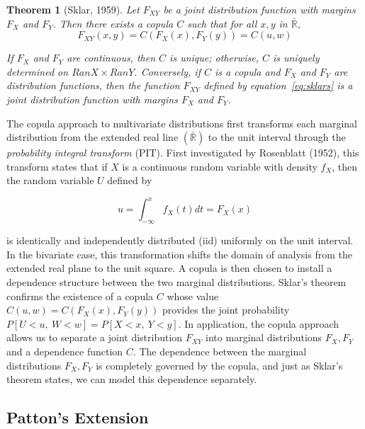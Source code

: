 \documentclass[12pt]{article}
\newtheorem{thm}{Theorem}
\begin{document}
\begin{thm} [Sklar, 1959] \label{thm:skl}
Let $F_{XY}$ be a joint distribution function with margins $F_{X}$ and $F_{Y}$. Then there exists a copula $C$ such that for all $x,y$ in $\bar{\mathbb{R}}$,
\begin{equation} \label{eq:sklars}
F_{XY}\left( x,y\right) =C\left(F_{X}\left(x\right), F_{Y}\left(y\right)\right) = C\left(u,w\right)
\end{equation}

If $F_{X}$ and $F_{Y}$ are continuous, then $C$ is unique; otherwise, $C$ is uniquely determined on $RanX\times RanY$. Conversely, if $C$ is a copula and $F_{X}$ and $F_{Y}$ are distribution functions, then the function $F_{XY}$ defined by equation~\ref{eq:sklars} is a joint distribution function with margins $F_{X}$ and $F_{Y}$.
\end{thm}

The copula approach to multivariate distributions first transforms each marginal distribution from the extended real line $\left(\bar{\mathbb{R}}\right)$ to the unit interval through the \textit{probability integral transform} (PIT). First investigated by Rosenblatt (1952), this transform states that if $X$ is a continuous random variable with density $f_{X}$, then the random variable $U$ defined by

\begin{equation} \label{eqn:PIT}
u=\int_{-\infty}^{x}f_{X}\left(t\right) dt=F_{X}\left(x\right)
\end{equation}

is identically and independently distributed (iid) uniformly on the unit interval. In the bivariate case, this transformation shifts the domain of analysis from the extended real plane to the unit square. A copula is then chosen to install a dependence structure between the two marginal distributions. Sklar's theorem confirms the existence of a copula $C$ whose value $C\left(u,w\right) = C\left(F_{X}\left(x\right), F_{Y}\left(y\right)\right)$ provides the joint probability $P\left[U < u,~W < w\right] = P\left[X < x,~Y < y\right]$. In application, the copula approach allows us to separate a joint distribution $F_{XY}$ into marginal distributions $F_{X},F_{Y}$ and a dependence function $C$. The dependence between the marginal distributions $F_{X},F_{Y}$ is completely governed by the copula, and just as Sklar's theorem states, we can model this dependence separately.

\subsection{Patton's Extension}
\end{document}

